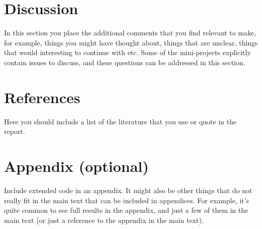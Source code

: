 \documentclass[a4paper,10pt]{article}
\begin{document}
\section{Discussion}
In this section you place the additional comments that you find relevant to make, for example, things you might have thought about, things that are unclear, things that would interesting to continue with etc. Some of the mini-projects explicitly contain issues to discuss, and these questions can be addressed in this section.

\section{References}
Here you should include a list of the literature that you use or quote in the report.

\section{Appendix (optional)}
Include extended code in an appendix. It might also be other things that do not really fit in the main text that can be included in appendices. For example, it's quite common to see full results in the appendix, and just a few of them in the main text (or just a reference to the appendix in the main text).
\end{document}
